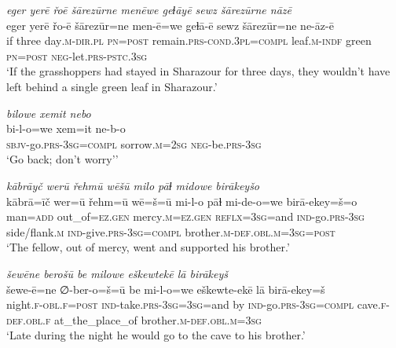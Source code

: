 \ea \label{PM.35}
\textit{eger yerē řoē šārezūrne menēwe geɫāyē sewz šārezūrne nāzē} \\ 
\gll eger yerē řo-ē šārezūr=ne men-ē=we geɫā-ē sewz šārezūr=ne ne-āz-ē \\ 
 if three day\textsc{.m}\textsc{-dir}\textsc{.pl} \textsc{pn}\textsc{=\textsc{post}} remain\textsc{.prs}\textsc{-cond}\textsc{.3pl}\textsc{=compl} leaf\textsc{.m}\textsc{-indf} green \textsc{pn}\textsc{=\textsc{post}} \textsc{neg-}let\textsc{.prs}\textsc{-pstc}\textsc{.3sg} \\ 
\glt `If the grasshoppers had stayed in Sharazour for three days, they wouldn’t have left behind a single green leaf in Sharazour.'
\z 
 
\ea \label{PM.40}
\textit{bilowe xemit nebo} \\ 
\gll bi-l-o=we xem=it ne-b-o \\ 
 \textsc{sbjv-}go\textsc{.prs}\textsc{-3sg}\textsc{=compl} sorrow\textsc{.m}\textsc{=\textsc{2sg}} \textsc{neg-}be\textsc{.prs}\textsc{-3sg} \\ 
\glt `Go back; don’t worry’'
\z 
 
\ea \label{DG.16}
\textit{kābrāyč werū řehmū wēšū milo pāɫ midowe birākeyšo} \\ 
\gll kābrā=īč wer=ū řehm=ū wē=š=ū mi-l-o pāɫ mi-de-o=we birā-ekey=š=o \\ 
 man\textsc{=add} out\_of\textsc{=ez}\textsc{.gen} mercy\textsc{.m}\textsc{=ez}\textsc{.gen} \textsc{reflx}\textsc{=3sg}=and \textsc{ind-}go\textsc{.prs}\textsc{-3sg} side/flank\textsc{.m} \textsc{ind-}give\textsc{.prs}\textsc{-3sg}\textsc{=\textsc{compl}} brother\textsc{.m}\textsc{-def}\textsc{.obl}\textsc{.m}\textsc{=3sg}\textsc{=\textsc{post}} \\ 
\glt `The fellow, out of mercy, went and supported his brother.'
\z 
 
\ea \label{DG.19}
\textit{šewēne berošū be milowe eškewtekē lā birākeyš} \\ 
\gll šewe-ē=ne ∅-ber-o=š=ū be mi-l-o=we eškewte-ekē lā birā-ekey=š \\ 
 night\textsc{\textsc{.f}}\textsc{-obl}\textsc{\textsc{.f}}\textsc{=\textsc{post}} \textsc{ind-}take\textsc{.prs}\textsc{-3sg}\textsc{=3sg}=and by \textsc{ind-}go\textsc{.prs}\textsc{-3sg}\textsc{=\textsc{compl}} cave\textsc{\textsc{.f}}\textsc{-def}\textsc{.obl}\textsc{\textsc{.f}} at\_the\_place\_of brother\textsc{.m}\textsc{-def}\textsc{.obl}\textsc{.m}\textsc{=3sg} \\ 
\glt `Late during the night he would go to the cave to his brother.'
\z 
 
